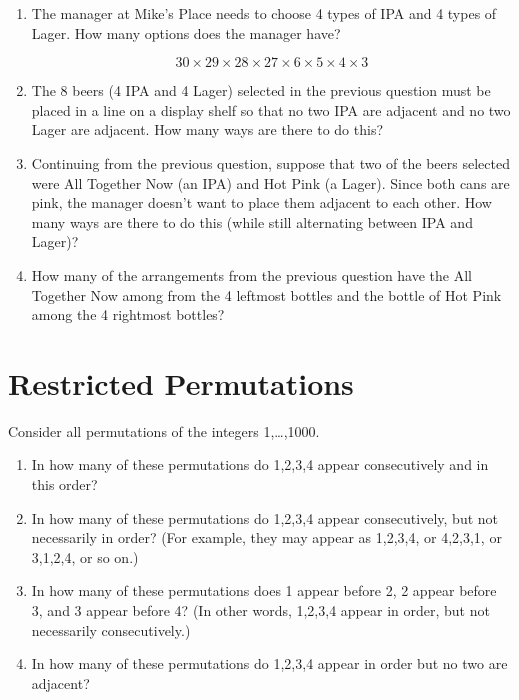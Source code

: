 \documentclass{article}
\begin{document}
\begin{enumerate}

   \item The manager at Mike's Place needs to choose 4 types of IPA and 4 types of Lager. How many options does the manager have?

   \[
     30\times 29\times 28\times 27\times 
     6\times 5\times 4\times 3
   \]
   
   \item The 8 beers (4 IPA and 4 Lager) selected in the previous question must be placed in a line on a display shelf so that no two IPA are adjacent and no two Lager are adjacent. How many ways are there to do this?

   \item Continuing from the previous question, suppose that two of the beers selected were All Together Now (an IPA) and Hot Pink (a Lager). Since both cans are pink, the manager doesn't want to place them adjacent to each other. How many ways are there to do this (while still alternating between IPA and Lager)?
   
   \item How many of the arrangements from the previous question have the All Together Now among from the 4 leftmost bottles and the bottle of Hot Pink among the 4 rightmost bottles?

\end{enumerate}

\section{Restricted Permutations}

Consider all permutations of the integers 1,…,1000.

\begin{enumerate}

   \item In how many of these permutations do 1,2,3,4 appear consecutively and in this order?
   
   \item In how many of these permutations do 1,2,3,4 appear consecutively, but not necessarily in order? (For example, they may appear as 1,2,3,4, or 4,2,3,1, or 3,1,2,4, or so on.)

   \item In how many of these permutations does 1 appear before 2, 2 appear before 3, and 3 appear before 4? (In other words, 1,2,3,4 appear in order, but not necessarily consecutively.)
   
   \item In how many of these permutations do 1,2,3,4 appear in order but no two are adjacent?
   
\end{enumerate}
\end{document}
